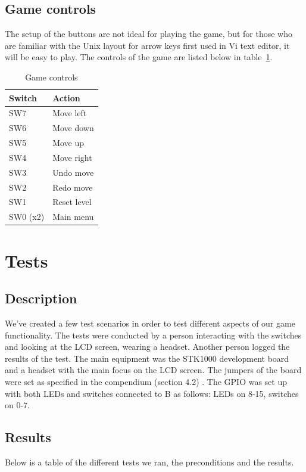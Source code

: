 \documentclass[a4paper,11pt]{article}
\begin{document}
\subsection{Game controls}
The setup of the buttons are not ideal for playing the game, but for those who are familiar with the Unix layout for arrow keys first used in Vi text editor, it will be easy to play. The controls of the game are listed below in table~\ref{tab:gamecontrols}. 

\begin{table}[H]
\centering
\begin{tabular}{|l|l|}
\hline \textbf{Switch} & \textbf{Action} \\ 
\hline SW7 & Move left \\ 
\hline SW6 & Move down \\ 
\hline SW5 & Move up \\ 
\hline SW4 & Move right \\ 
\hline SW3 & Undo move \\ 
\hline SW2 & Redo move \\ 
\hline SW1 & Reset level \\ 
\hline SW0 (x2) & Main menu \\
\hline 
\end{tabular}
\caption{Game controls} 
\label{tab:gamecontrols}
\end{table}

\section{Tests}
\subsection{Description}
We've created a few test scenarios in order to test different aspects of our game functionality. The tests were conducted by a person interacting with the switches and looking at the LCD screen, wearing a headset. Another person logged the results of the test. The main equipment was the STK1000 development board and a headset with the main focus on the LCD screen. The jumpers of the board were set as specified in the compendium (section 4.2) \cite{komp}. The GPIO was set up with both LEDs and switches connected to B as follows: LEDs on 8-15, switches on 0-7. 

\subsection{Results}
Below is a table of the different tests we ran, the preconditions and the results. 
\end{document}
